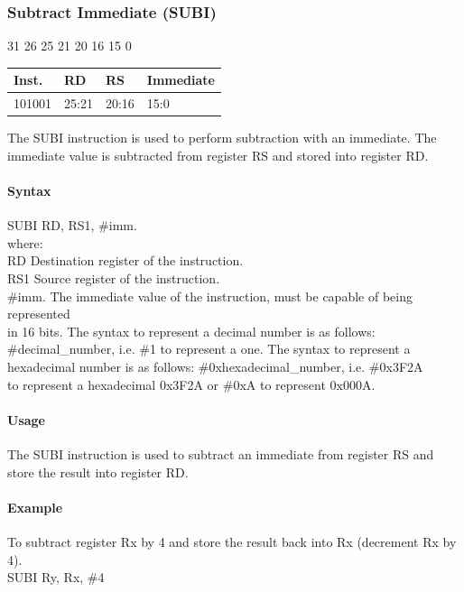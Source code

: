 \documentclass[12pt]{article}
\newcommand{\iTypeInstruction}[6]
{%
    \hspace{1.6cm}31 \hspace{1.15cm}26 \hspace{.05cm}25 \hspace{.8cm}21 \hspace{.05cm}20 \hspace{.8cm}16 \hspace{.05cm}15 \hspace{6.4cm}0
    \vspace{-.25cm}
    \begin{center}
        \begin{tabular}{ |p{1.8cm}|p{1.5cm}|p{1.5cm}|p{6.8cm}| }
            \hline
            \textbf{Inst.} & \textbf{RD} &  \textbf{RS} & \textbf{Immediate}\\
            \hline
            #1 & 25:21 & 20:16 &15:0\\
            \hline
        \end{tabular}
    \end{center}
    
    \noindent
    #2
    
    \paragraph{Syntax}
    \begin{flushleft}
    #3 RD, RS1, \#imm.\\
    \vspace{1em}        %
    where:\\
    \vspace{1em}
    RD  \hspace{3.6em} Destination register of the instruction.\\
    \vspace{1em}
    RS1  \hspace{3.35em} Source register of the instruction.\\
    \vspace{1em}
    \#imm.  \hspace{1.8em} The immediate value of the instruction, must be capable of being represented\\             \hspace{5.4em} in 16 bits. The syntax to represent a decimal number is as follows:\\
            \hspace{5.4em} \#decimal\_number, i.e. \#1 to represent a one. The syntax to represent a\\
            \hspace{5.4em} hexadecimal number is as follows: \#0xhexadecimal\_number, i.e. \#0x3F2A \\
            \hspace{5.4em} to represent a hexadecimal 0x3F2A or \#0xA to represent 0x000A.\\
    \end{flushleft}
    
    \paragraph{Usage}
    \begin{flushleft}
    #4\\
    \end{flushleft}
    \paragraph{Example}
    \begin{flushleft}
    #5\\
    \vspace{1em}
    #6
    \end{flushleft}}
\begin{document}

    \newpage
    \subsubsection{Subtract Immediate (SUBI)}
    
    \iTypeInstruction
    {101001}
    {The SUBI instruction is used to perform subtraction with an immediate. The immediate value is subtracted from register RS and stored into register RD.}
    {SUBI}
    {The SUBI instruction is used to subtract an immediate from register RS and store the result into register RD.}
    {To subtract register Rx by 4 and store the result back into Rx (decrement Rx by 4).}
    {SUBI Ry, Rx, \#4}
    
    
    
\end{document}
